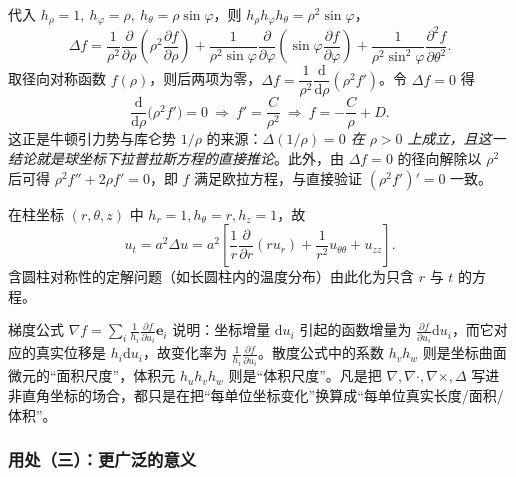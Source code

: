 \begin{example}[球坐标下的拉普拉斯算子]
代入 \(h_\rho=1,\ h_\varphi=\rho,\ h_\theta=\rho\sin\varphi\)，则 \(h_\rho h_\varphi h_\theta=\rho^2\sin\varphi\)，
\[
\Delta f=\frac{1}{\rho^2}\frac{\partial}{\partial\rho}\!\left(\rho^2\frac{\partial f}{\partial\rho}\right)
+\frac{1}{\rho^2\sin\varphi}\frac{\partial}{\partial\varphi}\!\left(\sin\varphi\frac{\partial f}{\partial\varphi}\right)
+\frac{1}{\rho^2\sin^2\varphi}\frac{\partial^2 f}{\partial\theta^2} .
\]
取径向对称函数 \(f(\rho)\)，则后两项为零，\(\Delta f=\dfrac{1}{\rho^2}\dfrac{\mathrm{d}}{\mathrm{d}\rho}\!\left(\rho^2f'\right)\)。令 \(\Delta f=0\) 得
\[
\frac{\mathrm{d}}{\mathrm{d}\rho}\bigl(\rho^2f'\bigr)=0
\ \Longrightarrow\ f'=\frac{C}{\rho^2}
\ \Longrightarrow\ f=-\frac{C}{\rho}+D .
\]
这正是牛顿引力势与库仑势 \(1/\rho\) 的来源：\emph{\(\Delta(1/\rho)=0\) 在 \(\rho>0\) 上成立，且这一结论就是球坐标下拉普拉斯方程的直接推论}。此外，由 \(\Delta f=0\) 的径向解除以 \(\rho^2\) 后可得 \(\rho^2f''+2\rho f'=0\)，即 \(f\) 满足欧拉方程，与直接验证 \((\rho^2f')'=0\) 一致。
\end{example}

\begin{example}[热传导方程在柱坐标下的形式]
在柱坐标 \((r,\theta,z)\) 中 \(h_r=1,h_\theta=r,h_z=1\)，故
\[
u_t=a^2\Delta u
=a^2\left[\frac1r\frac{\partial}{\partial r}\!\left(r u_r\right)+\frac{1}{r^2}u_{\theta\theta}+u_{zz}\right].
\]
含圆柱对称性的定解问题（如长圆柱内的温度分布）由此化为只含 \(r\) 与 \(t\) 的方程。
\end{example}

\begin{remark}[物理意义]
梯度公式 \(\nabla f=\sum_i\frac1{h_i}\frac{\partial f}{\partial u_i}\mathbf e_i\) 说明：坐标增量 \(\mathrm{d}u_i\) 引起的函数增量为 \(\frac{\partial f}{\partial u_i}\mathrm{d}u_i\)，而它对应的真实位移是 \(h_i\mathrm{d}u_i\)，故变化率为 \(\frac{1}{h_i}\frac{\partial f}{\partial u_i}\)。散度公式中的系数 \(h_vh_w\) 则是坐标曲面微元的“面积尺度”，体积元 \(h_uh_vh_w\) 则是“体积尺度”。凡是把 \(\nabla,\nabla\cdot,\nabla\times,\Delta\) 写进非直角坐标的场合，都只是在把“每单位坐标变化”换算成“每单位真实长度/面积/体积”。
\end{remark}

\subsubsection{用处（三）：更广泛的意义}

